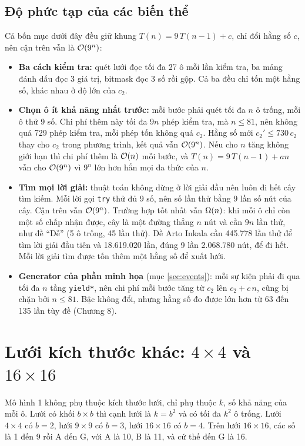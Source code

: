 \subsection*{Độ phức tạp của các biến thể}

Cả bốn mục dưới đây đều giữ khung \(T(n) = 9\,T(n - 1) + c\), chỉ đổi hằng số \(c\), nên cận trên vẫn là \(\mathcal{O}\!\left(9^n\right)\):

\begin{itemize}
  \item \textbf{Ba cách kiểm tra:} quét lưới đọc tối đa 27 ô mỗi lần kiểm tra, ba mảng đánh dấu đọc 3 giá trị, bitmask đọc 3 số rồi gộp. Cả ba đều chỉ tốn một hằng số, khác nhau ở độ lớn của \(c_2\).
  \item \textbf{Chọn ô ít khả năng nhất trước:} mỗi bước phải quét tối đa \(n\) ô trống, mỗi ô thử 9 số. Chi phí thêm này tối đa \(9n\) phép kiểm tra, mà \(n \le 81\), nên không quá 729 phép kiểm tra, mỗi phép tốn không quá \(c_2\). Hằng số mới \(c_2' \le 730\,c_2\) thay cho \(c_2\) trong phương trình, kết quả vẫn \(\mathcal{O}\!\left(9^n\right)\). Nếu cho \(n\) tăng không giới hạn thì chi phí thêm là \(\mathcal{O}\!\left(n\right)\) mỗi bước, và \(T(n) = 9\,T(n-1) + an\) vẫn cho \(\mathcal{O}\!\left(9^n\right)\) vì \(9^n\) lớn hơn hẳn mọi đa thức của \(n\).
  \item \textbf{Tìm mọi lời giải:} thuật toán không dừng ở lời giải đầu nên luôn đi hết cây tìm kiếm. Mỗi lời gọi \texttt{try} thử đủ 9 số, nên số lần thử bằng 9 lần số nút của cây. Cận trên vẫn \(\mathcal{O}\!\left(9^n\right)\). Trường hợp tốt nhất vẫn \(\Omega\!\left(n\right)\): khi mỗi ô chỉ còn một số chấp nhận được, cây là một đường thẳng \(n\) nút và cần \(9n\) lần thử, như đề ``Dễ'' (5 ô trống, 45 lần thử). Đề Arto Inkala cần 445.778 lần thử để tìm lời giải đầu tiên và 18.619.020 lần, đúng 9 lần 2.068.780 nút, để đi hết. Mỗi lời giải tìm được tốn thêm một hằng số để xuất lưới.
  \item \textbf{Generator của phần minh họa} (mục \ref{sec:events}): mỗi sự kiện phải đi qua tối đa \(n\) tầng \texttt{yield*}, nên chi phí mỗi bước tăng từ \(c_2\) lên \(c_2 + c\,n\), cũng bị chặn bởi \(n \le 81\). Bậc không đổi, nhưng hằng số đo được lớn hơn từ 63 đến 135 lần tùy đề (Chương 8).
\end{itemize}

\section{Lưới kích thước khác: \texorpdfstring{\(4 \times 4\) và \(16 \times 16\)}{4×4 và 16×16}}
\label{sec:sizes}

Mô hình 1 không phụ thuộc kích thước lưới, chỉ phụ thuộc \(k\), số khả năng của mỗi ô. Lưới có khối \(b \times b\) thì cạnh lưới là \(k = b^2\) và có tối đa \(k^2\) ô trống. Lưới \(4 \times 4\) có \(b = 2\), lưới \(9 \times 9\) có \(b = 3\), lưới \(16 \times 16\) có \(b = 4\). Trên lưới \(16 \times 16\), các số là 1 đến 9 rồi A đến G, với A là 10, B là 11, và cứ thế đến G là 16.

